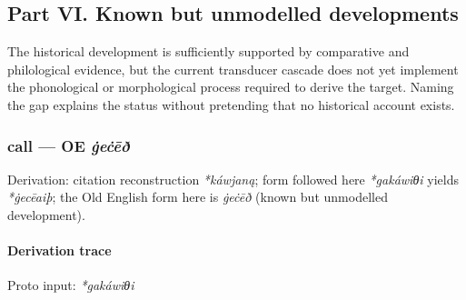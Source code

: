 \documentclass[
  british,
  a4paper,
]{article}
\providecommand{\Recon}[1]{\emph{*#1}}
\begin{document}
\clearpage

\subsection{Part VI. Known but unmodelled
developments}\label{part-vi.-known-but-unmodelled-developments}

The historical development is sufficiently supported by comparative and
philological evidence, but the current transducer cascade does not yet
implement the phonological or morphological process required to derive
the target. Naming the gap explains the status without pretending that
no historical account exists.

\subsubsection{\texorpdfstring{call --- OE
\emph{ġeċēð}}{call --- OE ġeċēð}}\label{call-oe-ux121eux10bux113uxf0}

Derivation: citation reconstruction \emph{*káwjaną}; form followed here
\emph{*gakáwiθi} yields \Recon{ġecēaiþ}; the Old English form here is
\emph{ġeċēð} (known but unmodelled development).

\paragraph{Derivation trace}\label{derivation-trace-177}

Proto input: \emph{*gakáwiθi}

\begingroup
\setlength{\fboxsep}{6pt}
\end{document}

